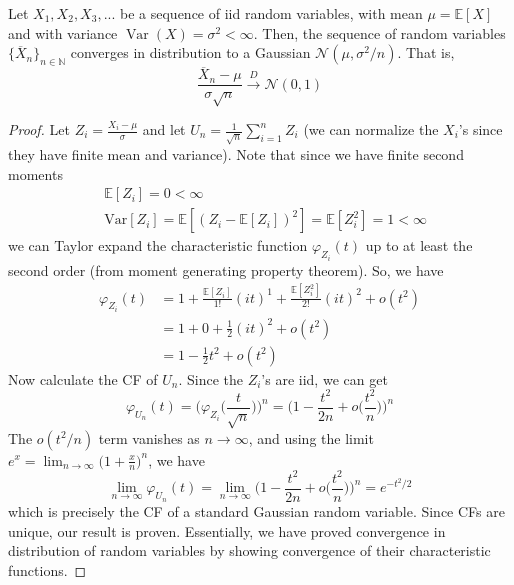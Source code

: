 \documentclass{article}
\DeclareMathOperator{\Var}{Var}
\begin{document}
    \begin{theorem}
      Let $X_1, X_2, X_3, ...$ be a sequence of iid random variables, with mean $\mu = \mathbb{E}[X]$ and with variance $\Var(X) = \sigma^2 < \infty$. Then, the sequence of random variables $\{\overline{X}_n\}_{n \in \mathbb{N}}$ converges in distribution to a Gaussian $\mathcal{N}(\mu, \sigma^2 / n)$. That is, 
      \begin{equation}
        \frac{\overline{X}_n - \mu}{\sigma \sqrt{n}} \xrightarrow{D} \mathcal{N}(0, 1)
      \end{equation}
    \end{theorem}
    \begin{proof}
      Let $Z_i = \frac{X_i - \mu}{\sigma}$ and let $U_n = \frac{1}{\sqrt{n}} \sum_{i=1}^n Z_i$ (we can normalize the $X_i$'s since they have finite mean and variance). Note that since we have finite second moments 
      \begin{align*}
        & \mathbb{E}[Z_i] = 0 < \infty \\
        & \mathrm{Var}[Z_i] = \mathbb{E}[ (Z_i - \mathbb{E}[Z_i])^2] = \mathbb{E}[Z_i^2] = 1 < \infty 
      \end{align*}
      we can Taylor expand the characteristic function $\varphi_{Z_i} (t)$ up to at least the second order (from moment generating property theorem). So, we have 
      \begin{align*}
        \varphi_{Z_i} (t) & = 1 + \frac{\mathbb{E}[Z_i]}{1!} (i t)^1 + \frac{\mathbb{E}[Z_i^2]}{2!} (i t)^2 + o (t^2) \\
        & = 1 + 0 + \frac{1}{2} (i t)^2 + o (t^2) \\
        & = 1 - \frac{1}{2} t^2 + o(t^2) 
      \end{align*}
      Now calculate the CF of $U_n$. Since the $Z_i$'s are iid, we can get 
      \begin{equation}
        \varphi_{U_n} (t) = \Big( \varphi_{Z_i} \big( \frac{t}{\sqrt{n}} \big) \Big)^n = \Big( 1 - \frac{t^2}{2n} + o \big( \frac{t^2}{n} \big) \Big)^n
      \end{equation}
      The $o(t^2 / n)$ term vanishes as $n \rightarrow \infty$, and using the limit $e^x = \lim_{n \rightarrow \infty} \big( 1 + \frac{x}{n} \big)^n$, we have 
      \begin{equation}
        \lim_{n \rightarrow \infty} \varphi_{U_n} (t) = \lim_{n \rightarrow \infty} \Big( 1 - \frac{t^2}{2n} + o \big( \frac{t^2}{n} \big) \Big)^n = e^{-t^2 / 2}
      \end{equation}
      which is precisely the CF of a standard Gaussian random variable. Since CFs are unique, our result is proven. Essentially, we have proved convergence in distribution of random variables by showing convergence of their characteristic functions. 
    \end{proof}
\end{document}
